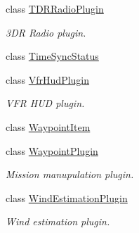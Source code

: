 \begin{DoxyCompactItemize}
class \mbox{\hyperlink{classmavros_1_1std__plugins_1_1TDRRadioPlugin}{T\+D\+R\+Radio\+Plugin}}
\begin{DoxyCompactList}\small\item\em 3DR Radio plugin. \end{DoxyCompactList}\item 
class \mbox{\hyperlink{classmavros_1_1std__plugins_1_1TimeSyncStatus}{Time\+Sync\+Status}}
\item 
class \mbox{\hyperlink{classmavros_1_1std__plugins_1_1VfrHudPlugin}{Vfr\+Hud\+Plugin}}
\begin{DoxyCompactList}\small\item\em V\+FR H\+UD plugin. \end{DoxyCompactList}\item 
class \mbox{\hyperlink{classmavros_1_1std__plugins_1_1WaypointItem}{Waypoint\+Item}}
\item 
class \mbox{\hyperlink{classmavros_1_1std__plugins_1_1WaypointPlugin}{Waypoint\+Plugin}}
\begin{DoxyCompactList}\small\item\em Mission manupulation plugin. \end{DoxyCompactList}\item 
class \mbox{\hyperlink{classmavros_1_1std__plugins_1_1WindEstimationPlugin}{Wind\+Estimation\+Plugin}}
\begin{DoxyCompactList}\small\item\em Wind estimation plugin. \end{DoxyCompactList}\end{DoxyCompactItemize}
